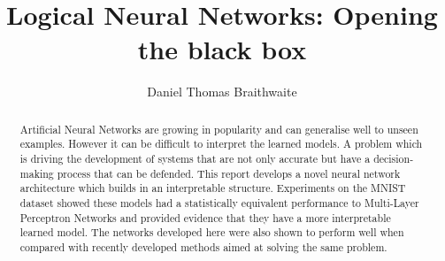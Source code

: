 \documentclass[11pt
              , a4paper
              , openright
              ]{report}
\title{Logical Neural Networks: Opening the black box}
\author{Daniel Thomas Braithwaite}
\date{}
\theoremstyle{definition}
\begin{document}
\frontmatter



\begin{abstract}
Artificial Neural Networks are growing in popularity and can generalise well to unseen examples. However it can be difficult to interpret the learned models. A problem which is driving the development of systems that are not only accurate but have a decision-making process that can be defended. This report develops a novel neural network architecture which builds in an interpretable structure. Experiments on the MNIST dataset showed these models had a statistically equivalent performance to Multi-Layer Perceptron Networks and provided evidence that they have a more interpretable learned model. The networks developed here were also shown to perform well when compared with recently developed methods aimed at solving the same problem.

\end{abstract}


\maketitle



\tableofcontents



\mainmatter









\backmatter



%




\end{document}
